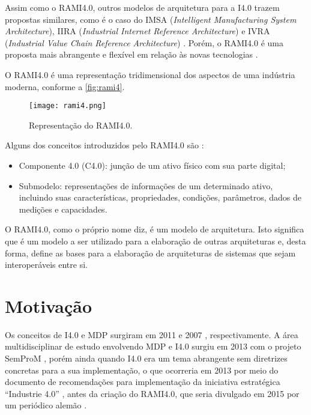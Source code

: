 Assim como o RAMI4.0, outros modelos de arquitetura para a I4.0 trazem propostas similares, como é o caso do IMSA (\textit{Intelligent Manufacturing System Architecture}), IIRA (\textit{Industrial Internet Reference Architecture}) e IVRA (\textit{Industrial Value Chain Reference Architecture}) \cite{li2018architectures}. Porém, o RAMI4.0 é uma proposta mais abrangente e flexível em relação às novas tecnologias \cite{hankel2015rami}.

O RAMI4.0 é uma representação tridimensional dos aspectos de uma indústria moderna, conforme a \autoref{fig:rami4}.

\begin{figure}[htb]
	\centering
	\texttt{[image: rami4.png]}
	\caption{Representação do RAMI4.0.}
	\label{fig:rami4}
\end{figure}

Alguns dos conceitos introduzidos pelo RAMI4.0 são \cite{bader2019aas}:

\begin{itemize}
	\item Componente 4.0 (C4.0): junção de um ativo físico com sua parte digital;
	\item Submodelo: representações de informações de um determinado ativo, incluindo suas características, propriedades, condições, parâmetros, dados de medições e capacidades.
\end{itemize}

O RAMI4.0, como o próprio nome diz, é um modelo de arquitetura. Isto significa que é um modelo a ser utilizado para a elaboração de outras arquiteturas e, desta forma, define as bases para a elaboração de arquiteturas de sistemas que sejam interoperáveis entre si.

\section{Motivação}
\label{sec:motivacao}

Os conceitos de I4.0 e MDP surgiram em 2011 \cite{kagermann2011industrie} e 2007 \cite{wahlster2007digitalmemory}, respectivamente. A área multidisciplinar de estudo envolvendo MDP e I4.0 surgiu em 2013 com o projeto SemProM \cite{wahlster2013semprom}, porém ainda quando I4.0 era um tema abrangente sem diretrizes concretas para a sua implementação, o que ocorreria em 2013 por meio do documento de recomendações para implementação da iniciativa estratégica ``Industrie 4.0'' \cite{kagermann2013recommendations}, antes da criação do RAMI4.0, que seria divulgado em 2015 por um periódico alemão \cite{hankel2015rami}.

